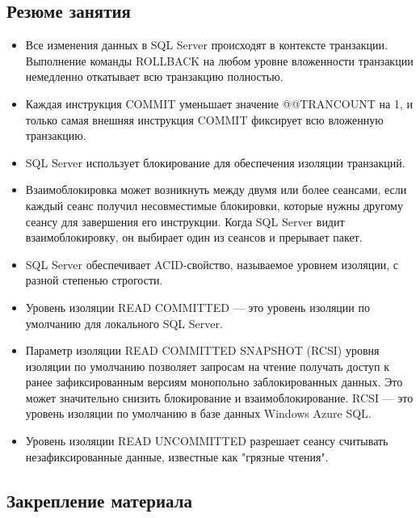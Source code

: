 \subsection*{Резюме занятия}
\begin{itemize}
\item Все изменения данных в SQL Server происходят в контексте транзакции. Выполнение команды ROLLBACK на любом уровне вложенности транзакции немедленно откатывает всю транзакцию полностью. 
\item Каждая инструкция COMMIT уменьшает значение @@TRANCOUNT на 1, и только самая
внешняя инструкция COMMIT фиксирует всю вложенную транзакцию. 
\item SQL Server использует блокирование для обеспечения изоляции транзакций. 
\item Взаимоблокировка может возникнуть между двумя или более сеансами, если
каждый сеанс получил несовместимые блокировки, которые нужны другому
сеансу для завершения его инструкции. Когда SQL Server видит взаимоблокировку, он выбирает один из сеансов и прерывает пакет. 
\item SQL Server обеспечивает ACID-свойство, называемое уровнем изоляции, с разной степенью строгости. 
\item Уровень изоляции READ COMMITTED — это уровень изоляции по умолчанию для
локального SQL Server. 
\item Параметр изоляции READ COMMITTED SNAPSHOT (RCSI) уровня изоляции по умолчанию позволяет запросам на чтение получать доступ к ранее зафиксированным
версиям монопольно заблокированных данных. Это может значительно снизить
блокирование и взаимоблокирование. RCSI — это уровень изоляции по умолчанию в базе данных Windows Azure SQL. 
\item  Уровень изоляции READ UNCOMMITTED разрешает сеансу считывать незафиксированные данные, известные как "грязные чтения". 
\end{itemize}

\subsection*{Закрепление материала}

